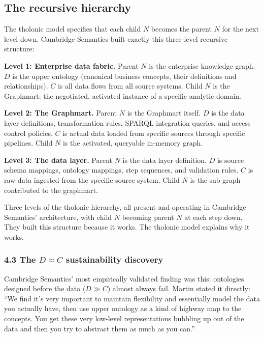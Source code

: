 \documentclass[12pt]{article}
\begin{document}
\subsection{The recursive hierarchy}\label{the-recursive-hierarchy}

The tholonic model specifies that each child \(N\) becomes the parent
\(N\) for the next level down. Cambridge Semantics built exactly this
three-level recursive structure:

\textbf{Level 1: Enterprise data fabric.} Parent \(N\) is the enterprise
knowledge graph. \(D\) is the upper ontology (canonical business
concepts, their definitions and relationships). \(C\) is all data flows
from all source systems. Child \(N\) is the Graphmart: the negotiated,
activated instance of a specific analytic domain.

\textbf{Level 2: The Graphmart.} Parent \(N\) is the Graphmart itself.
\(D\) is the data layer definitions, transformation rules, SPARQL
integration queries, and access control policies. \(C\) is actual data
loaded from specific sources through specific pipelines. Child \(N\) is
the activated, queryable in-memory graph.

\textbf{Level 3: The data layer.} Parent \(N\) is the data layer
definition. \(D\) is source schema mappings, ontology mappings, step
sequences, and validation rules. \(C\) is raw data ingested from the
specific source system. Child \(N\) is the sub-graph contributed to the
graphmart.

Three levels of the tholonic hierarchy, all present and operating in
Cambridge Semantics' architecture, with child \(N\) becoming parent
\(N\) at each step down. They built this structure because it works. The
tholonic model explains why it works.

\subsubsection{\texorpdfstring{4.3 The \(D \approx C\) sustainability
discovery}{4.3 The D \textbackslash approx C sustainability discovery}}\label{the-d-approx-c-sustainability-discovery}

Cambridge Semantics' most empirically validated finding was this:
ontologies designed before the data (\(D \gg C\)) almost always fail.
Martin stated it directly: ``We find it's very important to maintain
flexibility and essentially model the data you actually have, then use
upper ontology as a kind of highway map to the concepts. You get these
very low-level representations bubbling up out of the data and then you
try to abstract them as much as you can.''
\end{document}
